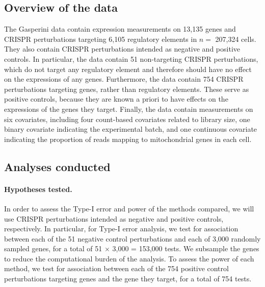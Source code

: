 \documentclass[12pt]{article}
\theoremstyle{definition}
\begin{document}
\subsection{Overview of the data}

The Gasperini data contain expression measurements on 13,135 genes and CRISPR perturbations targeting 6,105 regulatory elements in $n =$ 207,324 cells. They also contain CRISPR perturbations intended as negative and positive controls. In particular, the data contain 51 non-targeting CRISPR perturbations, which do not target any regulatory element and therefore should have no effect on the expressions of any genes. Furthermore, the data contain 754 CRISPR perturbations targeting genes, rather than regulatory elements. These serve as positive controls, because they are known a priori to have effects on the expressions of the genes they target. Finally, the data contain measurements on six covariates, including four count-based covariates related to library size, one binary covariate indicating the experimental batch, and one continuous covariate indicating the proportion of reads mapping to mitochondrial genes in each cell.

\subsection{Analyses conducted}

\paragraph{Hypotheses tested.} In order to assess the Type-I error and power of the methods compared, we will use CRISPR perturbations intended as negative and positive controls, respectively. In particular, for Type-I error analysis, we test for association between each of the 51 negative control perturbations and each of 3,000 randomly sampled genes, for a total of 51 $\times$ 3,000 = 153,000 tests. We subsample the genes to reduce the computational burden of the analysis. To assess the power of each method, we test for association between each of the 754 positive control perturbations targeting genes and the gene they target, for a total of 754 tests. 
\end{document}
